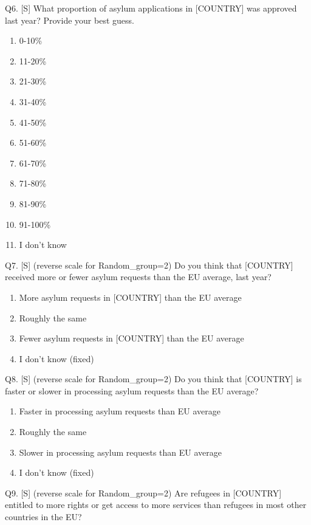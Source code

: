 \documentclass[
  12pt,
  a4paper,
]{article}
\providecommand{\tightlist}{%
  \setlength{\itemsep}{0pt}\setlength{\parskip}{0pt}}
\begin{document}
Q6. {[}S{]} What proportion of asylum applications in {[}COUNTRY{]} was approved last year? Provide your best guess.

\begin{enumerate}
\def\labelenumi{\arabic{enumi}.}
\tightlist
\item
  0-10\%
\item
  11-20\%
\item
  21-30\%
\item
  31-40\%
\item
  41-50\%
\item
  51-60\%
\item
  61-70\%
\item
  71-80\%
\item
  81-90\%
\item
  91-100\%
\item
  I don't know
\end{enumerate}

Q7. {[}S{]} (reverse scale for Random\_group=2) Do you think that {[}COUNTRY{]} received more or fewer asylum requests than the EU average, last year?

\begin{enumerate}
\def\labelenumi{\arabic{enumi}.}
\tightlist
\item
  More asylum requests in {[}COUNTRY{]} than the EU average
\item
  Roughly the same
\item
  Fewer asylum requests in {[}COUNTRY{]} than the EU average
\item
  I don't know (fixed)
\end{enumerate}

Q8. {[}S{]} (reverse scale for Random\_group=2) Do you think that {[}COUNTRY{]} is faster or slower in processing asylum requests than the EU average?

\begin{enumerate}
\def\labelenumi{\arabic{enumi}.}
\tightlist
\item
  Faster in processing asylum requests than EU average
\item
  Roughly the same
\item
  Slower in processing asylum requests than EU average
\item
  I don't know (fixed)
\end{enumerate}

Q9. {[}S{]} (reverse scale for Random\_group=2) Are refugees in {[}COUNTRY{]} entitled to more rights or get access to more services than refugees in most other countries in the EU?
\end{document}
